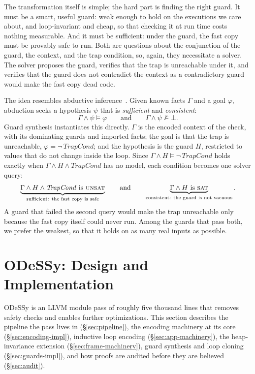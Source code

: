 \documentclass[acmsmall,screen,nonacm]{acmart}
\newcommand{\odessy}{ODeSSy}
\newcommand{\tool}{\odessy}
\begin{document}
The transformation itself is simple; the hard part is finding the right guard. It must
be a smart, useful guard: weak enough to hold on the executions we care
about, and loop-invariant and cheap, so that checking it at run time costs nothing
measurable. And it must be sufficient: under the guard, the fast copy
must be provably safe to run. Both are questions about the conjunction
of the guard, the context, and the trap condition, so, again, they
necessitate a solver. The solver proposes the guard, verifies that the
trap is unreachable under it, and verifies that the guard does not
contradict the context as a contradictory guard would make the fast
copy dead code.

The idea resembles abductive inference~\cite{dillig2012abductive,
dillig2013abductive}. Given known facts $\Gamma$ and a goal $\varphi$,
abduction seeks a hypothesis $\psi$ that is \emph{sufficient} and
\emph{consistent}:
\[
\Gamma \wedge \psi \models \varphi
\qquad\text{and}\qquad
\Gamma \wedge \psi \not\models \bot .
\]
Guard synthesis instantiates this directly. $\Gamma$ is the encoded
context of the check, with its dominating guards and imported facts; the
goal is that the trap is unreachable, $\varphi = \neg\,\mathit{TrapCond}$; and
the hypothesis is the guard $H$, restricted to values that do not change
inside the loop. Since $\Gamma \wedge H \models \neg\,\mathit{TrapCond}$
holds exactly when $\Gamma \wedge H \wedge \mathit{TrapCond}$ has no model,
each condition becomes one solver query:
\[
\underbrace{\Gamma \wedge H \wedge \mathit{TrapCond}\ \text{is \textsc{unsat}}}_{\text{sufficient: the fast copy is safe}}
\qquad\text{and}\qquad
\underbrace{\Gamma \wedge H\ \text{is \textsc{sat}}}_{\text{consistent: the guard is not vacuous}} .
\]
A guard that failed the second query would make the trap unreachable
only because the fast copy itself could never run. Among the guards that
pass both, we prefer the weakest, so that it holds on as many real
inputs as possible.

\section{\tool{}: Design and Implementation}
\label{sec:system}
\tool{} is an LLVM module pass of roughly five thousand lines that removes safety checks and enables further optimizations.
This section describes the pipeline the pass lives in
(\S\ref{sec:pipeline}), the encoding machinery at its core
(\S\ref{sec:encoding-impl}), inductive loop encoding
(\S\ref{sec:app-machinery}), the heap-invariance extension
(\S\ref{sec:frame-machinery}), guard synthesis and loop cloning
(\S\ref{sec:guards-impl}), and how proofs are audited before they are
believed (\S\ref{sec:audit}).
\end{document}

